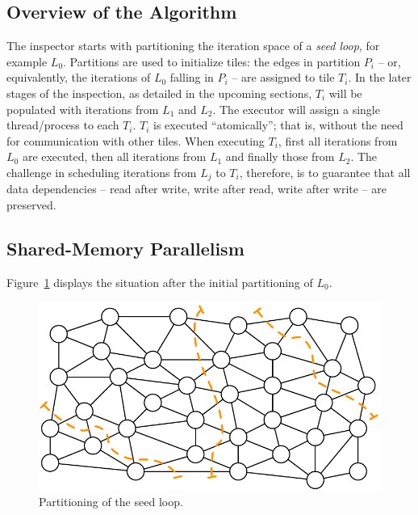 \subsection{Overview of the Algorithm}
The inspector starts with partitioning the iteration space of a \textit{seed loop}, for example $L_0$. Partitions are used to initialize tiles: the edges in partition $P_i$ -- or, equivalently, the iterations of $L_0$ falling in $P_i$ -- are assigned to tile $T_i$. In the later stages of the inspection,  as detailed in the upcoming sections, $T_i$ will be populated with iterations from $L_1$ and $L_2$. The executor will assign a single thread/process to each $T_i$. $T_i$ is executed ``atomically''; that is, without the need for communication with other tiles. When executing $T_i$, first all iterations from $L_0$ are executed, then all iterations from $L_1$ and finally those from $L_2$. The challenge in scheduling iterations from $L_j$ to $T_i$, therefore, is to guarantee that all data dependencies -- read after write, write after read, write after write -- are preserved. 

\subsection{Shared-Memory Parallelism}
\label{sec:tiling:ex-sm}
Figure~\ref{fig:st-initial-part-sm} displays the situation after the initial partitioning of $L_0$. 

\begin{figure}[h]
\centering
\includegraphics[scale=0.7]{sparsetiling/figures/partiotioned.pdf}
\caption{Partitioning of the seed loop.}
\label{fig:st-initial-part-sm}
\end{figure}

